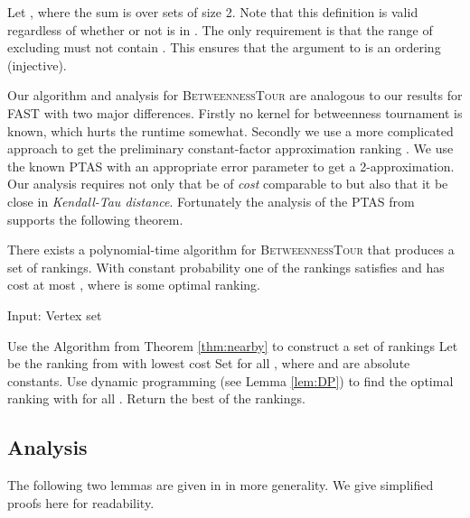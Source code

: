 \documentclass[envcountsame,oribibl]{llncs}
\newcommand{\betTour}{\textsc{BetweennessTour}}
\newcommand{\fast}{\textsc{FAST}}
\begin{document}
Let , where the sum is over sets  of size 2. Note that this definition is valid regardless of whether or not  is in . The only requirement is that the range of  excluding  must not contain . This ensures that the argument to  is an ordering (injective). 

Our algorithm and analysis for \betTour{} are analogous to our results for \fast{} with two major differences. Firstly no kernel for betweenness tournament is known, which hurts the runtime somewhat. Secondly we use a more complicated approach to get the preliminary constant-factor approximation ranking .
We use the known PTAS \cite{Karpinski09betweenness} with an appropriate error parameter to get a 2-approximation. Our analysis requires not only that  be of \emph{cost} comparable to  but also that it be close in \emph{Kendall-Tau distance}. Fortunately the analysis of the PTAS from \cite{Karpinski09betweenness} supports the following theorem.

\begin{theorem} \label{thm:nearby}
There exists a polynomial-time algorithm for \betTour{} that produces a set  of  rankings. With constant probability one of the rankings  satisfies   and has cost at most , where  is some optimal ranking.
\end{theorem}

\begin{algorithm}[t]
Input: Vertex set 
\begin{algorithmic}[1]
 \STATE Use the Algorithm from Theorem \ref{thm:nearby} to construct a set of rankings 
 \STATE Let  be the ranking from  with lowest cost
 \IF{}
  \STATE Set  for all , where  and  are absolute constants.
  \STATE Use dynamic programming (see Lemma \ref{lem:DP}) to find the optimal ranking  with  for all .
 \ENDIF
\ENDFOR
\STATE Return the best of the  rankings.
\end{algorithmic}

\caption{Our algorithm for \betTour. The runtime is . }
\label{alg:exactGen}
\end{algorithm}



\subsection{Analysis}  \label{sec:betAnalysis}

The following two lemmas are given in \cite{Karpinski09betweenness} in more generality. We give simplified proofs here for readability.
\end{document}
